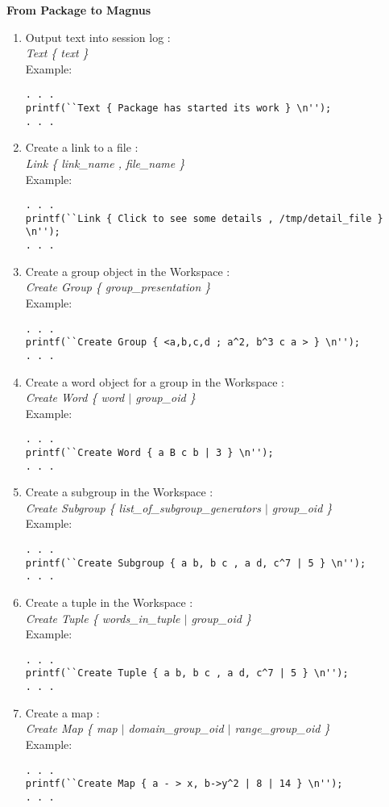 \documentclass[12pt]{article}
\begin{document}
\textbf{ From Package to Magnus }
\begin{enumerate}
\item Output text into session log : \\
\emph{Text \{ text \} } \\
Example:
\begin{verbatim}
. . .
printf(``Text { Package has started its work } \n'');
. . .
\end{verbatim}

\item Create a link to a file : \\
\emph{Link \{ link\_name , file\_name \} } \\
Example:
\begin{verbatim}
. . .
printf(``Link { Click to see some details , /tmp/detail_file } \n'');
. . .
\end{verbatim}
\item Create a group object in the Workspace : \\
\emph{Create Group \{ group\_presentation \} } \\
Example:
\begin{verbatim}
. . .
printf(``Create Group { <a,b,c,d ; a^2, b^3 c a > } \n'');
. . .
\end{verbatim}
\item Create a word object for a group in the Workspace : \\
\emph{Create Word \{ word $|$ group\_oid \} } \\
Example:
\begin{verbatim}
. . .
printf(``Create Word { a B c b | 3 } \n'');
. . .
\end{verbatim}
\item Create a subgroup in the Workspace : \\
\emph{Create Subgroup \{ list\_of\_subgroup\_generators $|$ group\_oid \} }\\
Example:
\begin{verbatim}
. . .
printf(``Create Subgroup { a b, b c , a d, c^7 | 5 } \n'');
. . .
\end{verbatim}
\item Create a tuple in the Workspace : \\
\emph{Create Tuple \{ words\_in\_tuple $|$ group\_oid \} }\\
Example:
\begin{verbatim}
. . .
printf(``Create Tuple { a b, b c , a d, c^7 | 5 } \n'');
. . .
\end{verbatim}
\item Create a map : \\
\emph{Create Map \{ map $|$ domain\_group\_oid $|$ range\_group\_oid \} }\\
Example:
\begin{verbatim}
. . .
printf(``Create Map { a - > x, b->y^2 | 8 | 14 } \n'');
. . .
\end{verbatim}
\end{enumerate}
\end{document}
